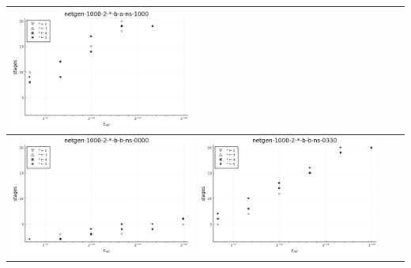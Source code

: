 \documentclass{article}
\begin{document}
\begin{landscape}
\begin{center}
\begin{longtable}{| c | c | c | c |}
\includegraphics[height=0.22\textheight]{hiter_fixlim_netgen-1000-2-_-b-a-ns-1000.png} \\
                \hline
\includegraphics[height=0.22\textheight]{hiter_fixlim_netgen-1000-2-_-b-b-ns-0000.png} &
\includegraphics[height=0.22\textheight]{hiter_fixlim_netgen-1000-2-_-b-b-ns-0330.png} &

\end{longtable}
\end{center}
\end{landscape}
\end{document}
